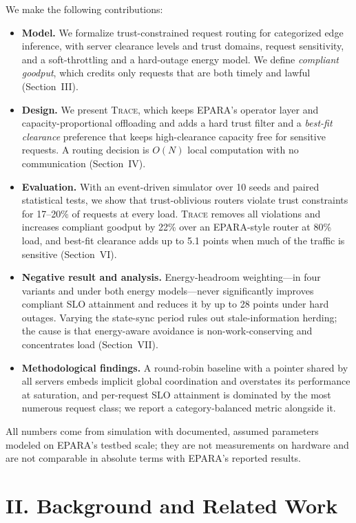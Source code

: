 \documentclass{article}
\newcommand{\sys}{\textsc{Trace}}
\begin{document}
We make the following contributions:
\begin{itemize}
\item \textbf{Model.} We formalize trust-constrained request routing for categorized edge inference, with server clearance levels and trust domains, request sensitivity, and a soft-throttling and a hard-outage energy model. We define \emph{compliant goodput}, which credits only requests that are both timely and lawful (Section~III).
\item \textbf{Design.} We present \sys{}, which keeps EPARA's operator layer and capacity-proportional offloading and adds a hard trust filter and a \emph{best-fit clearance} preference that keeps high-clearance capacity free for sensitive requests. A routing decision is $O(N)$ local computation with no communication (Section~IV).
\item \textbf{Evaluation.} With an event-driven simulator over 10 seeds and paired statistical tests, we show that trust-oblivious routers violate trust constraints for 17--20\% of requests at every load. \sys{} removes all violations and increases compliant goodput by 22\% over an EPARA-style router at 80\% load, and best-fit clearance adds up to 5.1 points when much of the traffic is sensitive (Section~VI).
\item \textbf{Negative result and analysis.} Energy-headroom weighting---in four variants and under both energy models---never significantly improves compliant SLO attainment and reduces it by up to 28 points under hard outages. Varying the state-sync period rules out stale-information herding; the cause is that energy-aware avoidance is non-work-conserving and concentrates load (Section~VII).
\item \textbf{Methodological findings.} A round-robin baseline with a pointer shared by all servers embeds implicit global coordination and overstates its performance at saturation, and per-request SLO attainment is dominated by the most numerous request class; we report a category-balanced metric alongside it.
\end{itemize}

All numbers come from simulation with documented, assumed parameters modeled on EPARA's testbed scale; they are not measurements on hardware and are not comparable in absolute terms with EPARA's reported results.

\section*{II. Background and Related Work}
\end{document}
